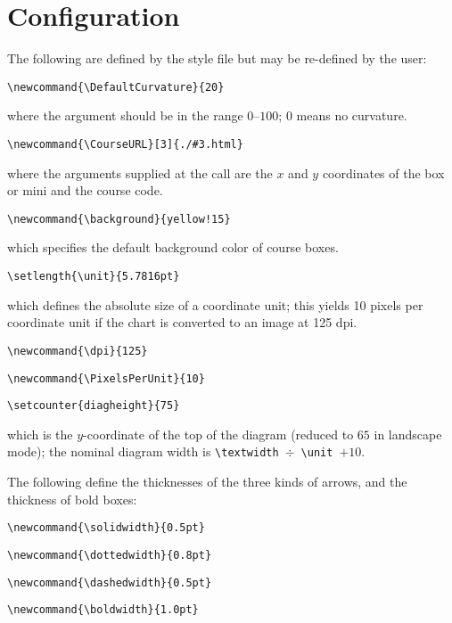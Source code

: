 \documentclass[11pt]{article}
\begin{document}
\section{Configuration} 
\label{Configuration}
The following are defined by the style file but may be re-defined by the
user:
\begin{list}{}{}
\item \verb|\newcommand{\DefaultCurvature}{20}|
\end{list}
where the argument should be in the range $0$--$100$; $0$ means no curvature.
\begin{list}{}{}
\item \verb|\newcommand{\CourseURL}[3]{./#3.html}|
\end{list}
where the arguments supplied at the call are the $x$ and $y$ coordinates
of the box or mini and the course code.
\begin{list}{}{}
\item \verb|\newcommand{\background}{yellow!15}|
\end{list}
which specifies the default background color of course boxes.
\begin{list}{}{}
\item \verb|\setlength{\unit}{5.7816pt}|
\end{list}
which defines the absolute size of a coordinate unit;
this yields 10 pixels per
coordinate unit if the chart is converted to an image at 125 dpi.
\begin{list}{}{}
\item \verb|\newcommand{\dpi}{125}| 
\item \verb|\newcommand{\PixelsPerUnit}{10}| 
\end{list}
\begin{list}{}{}
\item \verb|\setcounter{diagheight}{75}|
\end{list}
which is the 
$y$-coordinate
of the top of the diagram (reduced to $65$ in landscape mode);
the nominal diagram width is 
\verb|\textwidth|~$\div$~\verb|\unit|~$+ 10$.


The following define the thicknesses of the three kinds of arrows,
and the thickness of bold boxes:
\begin{list}{}{}
\item
\verb|\newcommand{\solidwidth}{0.5pt}|
\item
\verb|\newcommand{\dottedwidth}{0.8pt}|
\item
\verb|\newcommand{\dashedwidth}{0.5pt}|
\item
\verb|\newcommand{\boldwidth}{1.0pt}|
\end{list}
\end{document}
